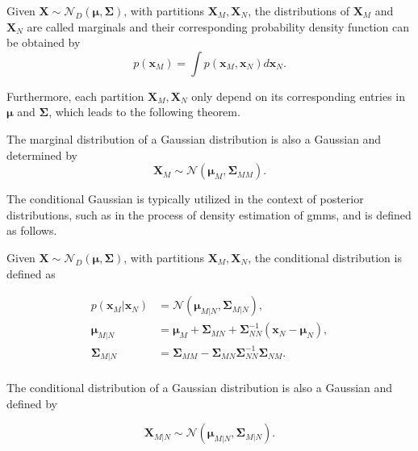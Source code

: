 \documentclass[../../../main.tex]{subfiles}
\begin{document}
\begin{definition}\label{def:marg_gaussian} \cite[p. 177]{dei_2020}
Given $\bm{X} \sim \mathcal{N}_D(\bm{\mu}, \bm{\Sigma})$, with partitions $\bm{X}_M, \bm{X}_N$, the distributions of $\bm{X}_M$ and $\bm{X}_N$ are called marginals and their corresponding probability density function can be obtained by
\begin{equation*}
    p(\bm{x}_M) = \int p(\bm{x}_M,\bm{x}_N)d\bm{x}_N.
\end{equation*}
\end{definition}

Furthermore, each partition $\bm{X}_M, \bm{X}_N$ only depend on its corresponding entries in $\bm{\mu}$ and  $\bm{\Sigma}$, which leads to the following theorem. 

\begin{theorem} \cite[p. 177]{dei_2020}
The marginal distribution of a Gaussian distribution is also a Gaussian and determined by
\begin{equation*}
    \bm{X}_M \sim \mathcal{N}(\bm{\mu}_M, \bm{\Sigma}_{MM}).
\end{equation*}
\end{theorem}

The conditional Gaussian is typically utilized in the context of posterior distributions, such as in the process of density estimation of \glspl{gmm}, and is defined as follows.

\begin{definition} \cite[p. 177]{dei_2020}
Given $\bm{X} \sim \mathcal{N}_D(\bm{\mu}, \bm{\Sigma})$, with partitions $\bm{X}_M, \bm{X}_N$, the conditional distribution is defined as

\begin{align*}
    p(\bm{x}_M | \bm{x}_N) &= \mathcal{N}(\bm{\mu}_{M | N}, \bm{\Sigma}_{M | N}), \\
    \bm{\mu}_{M | N} &= \bm{\mu}_M + \bm{\Sigma}_{M N} + \bm{\Sigma}^{-1}_{N N}(\bm{x}_N - \bm{\mu}_N),\\
    \bm{\Sigma}_{M | N} &= \bm{\Sigma}_{M M} - \bm{\Sigma}_{M N} \bm{\Sigma}^{-1}_{N N}\bm{\Sigma}_{N M}.\\
\end{align*}
\end{definition}

\begin{theorem} \cite[p. 177]{dei_2020}
The conditional distribution of a Gaussian distribution is also a Gaussian and defined by 

\begin{equation*}
    \bm{X}_{M | N} \sim \mathcal{N}(\bm{\mu}_{M | N}, \bm{\Sigma}_{M | N}).
\end{equation*}
\end{theorem}
\end{document}
